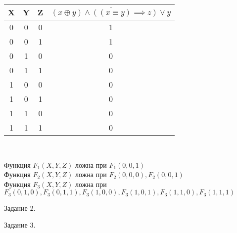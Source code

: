 \documentclass[a4paper,12pt]{report} %
\begin{document}
\begin{flushleft}
	\begin{center}
		\begin{tabular}{ | c | c | c | c |}
			\hline
			X & Y & Z & $\overline{(x \oplus y) \wedge ((x \equiv y) \implies z) \vee y}$ \\
			\hline
			0 & 0 & 0 & 1                                                                 \\
			\hline
			0 & 0 & 1 & 1                                                                 \\ 
			\hline
			0 & 1 & 0 & 0                                                                 \\
			\hline
			0 & 1 & 1 & 0                                                                 \\
			\hline
			1 & 0 & 0 & 0                                                                 \\
			\hline
			1 & 0 & 1 & 0                                                                 \\
			\hline
			1 & 1 & 0 & 0                                                                 \\
			\hline
			1 & 1 & 1 & 0                                                                 \\
			\hline
		\end{tabular} \\
	\end{center}
	
	Функция $F_1(X,Y,Z)$ ложна при $F_1(0,0,1)$\\
	Функция $F_2(X,Y,Z)$ ложна при $F_2(0,0,0), F_2(0,0,1)$\\
	Функция $F_3(X,Y,Z)$ ложна при $F_3(0,1,0), F_3(0,1,1), F_3(1,0,0), F_3(1,0,1), F_3(1,1,0), F_3(1,1,1)$\\
	
\end{flushleft}

\bigskip

\newpage
\begin{center}
	Задание  2.\\
\end{center}
	
\begin{flushleft}
	
	
\end{flushleft}

\bigskip


\begin{center}
	Задание 3.
\end{center}
\end{document}
